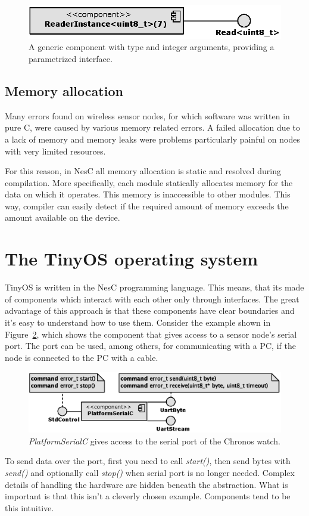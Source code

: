 \begin{figure}[h]
  \centering
  \includegraphics{diagrams/generic_component.eps}
  \caption{A generic component with type and integer arguments,
  providing a parametrized interface.}
  \label{fig:generic_component}
\end{figure}

\subsection{Memory allocation}
Many errors found on wireless sensor nodes, for which software was written in pure C, were caused by various memory related errors. A failed allocation due to a lack of memory and memory leaks were problems particularly painful on nodes with very limited resources.

For this reason, in NesC all memory allocation is static and resolved during compilation. More specifically, each module statically allocates memory for the data on which it operates. This memory is inaccessible to other modules. This way, compiler can easily detect if the required amount of memory exceeds the amount available on the device.

\section{The TinyOS operating system}

TinyOS is written in the NesC programming language. This means, that its made of components which interact with each other only through interfaces. The great advantage of this approach is that these components have clear boundaries and it's easy to understand how to use them. Consider the example shown in Figure~\ref{fig:platform_serial}, which shows the component that gives access to a sensor node's serial port. The port can be used, among others, for communicating with a PC, if the node is connected to the PC with a cable.
\begin{figure}[h]
  \centering
  \includegraphics{diagrams/platform_serial.eps}
  \caption{\emph{PlatformSerialC} gives access to the serial port of the 
           Chronos watch.}
  \label{fig:platform_serial}
\end{figure}
To send data over the port, first you need to call \emph{start()}, then send bytes with \emph{send()} and optionally call \emph{stop()} when serial port is no longer needed. Complex details of handling the hardware are hidden beneath the abstraction. What is important is that this isn't a cleverly chosen example. Components tend to be this intuitive.

